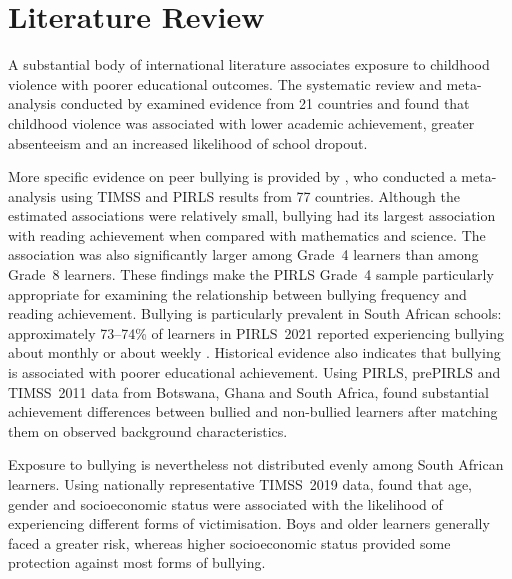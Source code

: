 \section{Literature Review}

A substantial body of international literature associates exposure to
childhood violence with poorer educational outcomes. The systematic review
and meta-analysis conducted by \citet{FRY20186} examined evidence from 21
countries and found that childhood violence was associated with lower
academic achievement, greater absenteeism and an increased likelihood of
school dropout.

More specific evidence on peer bullying is provided by
\citet{ozyildirim2024effect}, who conducted a meta-analysis using TIMSS and PIRLS
results from 77 countries. Although the estimated associations were
relatively small, bullying had its largest association with reading
achievement when compared with mathematics and science. The association
was also significantly larger among Grade~4 learners than among Grade~8
learners. These findings make the PIRLS Grade~4 sample particularly
appropriate for examining the relationship between bullying frequency and
reading achievement. Bullying is particularly
prevalent in South African schools: approximately 73--74\% of learners in
PIRLS~2021 reported experiencing bullying about monthly or about weekly
\citep{mullis2023pirls}. Historical evidence also indicates that bullying is
associated with poorer educational achievement. Using PIRLS, prePIRLS and
TIMSS~2011 data from Botswana, Ghana and South Africa,
\citet{anton_erxleben2016bullying} found substantial achievement differences between bullied and
non-bullied learners after matching them on observed background
characteristics.

Exposure to bullying is nevertheless not distributed evenly among South
African learners. Using nationally representative TIMSS~2019 data,
\citet{juan2025risk} found that age, gender and socioeconomic status were
associated with the likelihood of experiencing different forms of
victimisation. Boys and older learners generally faced a greater risk,
whereas higher socioeconomic status provided some protection against most
forms of bullying.

